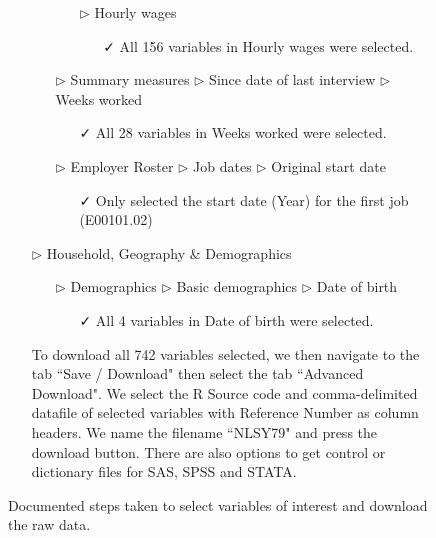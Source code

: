 \documentclass[12pt]{article}
\begin{document}
\begin{figure}[p]
\begin{tcolorbox}[title = Navigating the data source, fontupper=\linespread{.8}\selectfont]
\begin{itemize}
\begin{itemize}
\begin{itemize}
\begin{itemize}
\end{itemize}
\item[$\triangleright$] Hourly wages
\begin{itemize}
\item[\faCheck] All 156 variables in Hourly wages were selected.
\end{itemize}
\end{itemize}
\end{itemize}
\begin{itemize}
\item[$\triangleright$] Summary measures $\triangleright$ Since date of last interview $\triangleright$ Weeks worked
\begin{itemize}
\item[\faCheck] All 28 variables in Weeks worked were selected.
\end{itemize}
\end{itemize}
\begin{itemize}
\item[$\triangleright$] Employer Roster $\triangleright$ Job dates $\triangleright$ Original start date
\begin{itemize}
\item[\faCheck] Only selected the start date (Year) for the first job (E00101.02)
\end{itemize}
\end{itemize}
\item[$\triangleright$] Household, Geography \& Demographics
\begin{itemize}
\item[$\triangleright$] Demographics $\triangleright$ Basic demographics $\triangleright$ Date of birth
\begin{itemize}
\item[\faCheck] All 4 variables in Date of birth were selected. 
\end{itemize}
\end{itemize}
\end{itemize}
\begin{itemize}
\item[\faCloudDownload] To download all 742 variables selected, we then navigate to the tab ``Save / Download" then select the tab ``Advanced Download". We select the R Source code and comma-delimited datafile of selected variables with Reference Number as column headers. We name the filename ``NLSY79" and press the download button. There are also options to get control or dictionary files for SAS, SPSS and STATA. 
\end{itemize}
\end{tcolorbox}
\caption{Documented steps taken to select variables of interest and download the raw data.\label{fig:source-nav}}
\end{figure}
\end{document}
